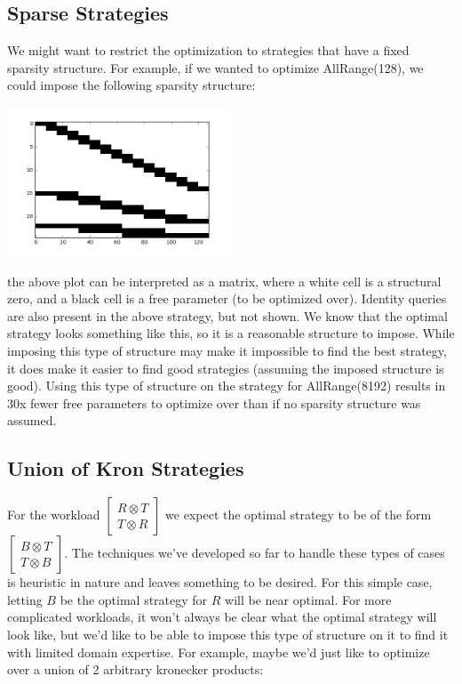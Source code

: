 \documentclass[12]{article}
\begin{document}
\subsection{Sparse Strategies}

We might want to restrict the optimization to strategies that have a fixed sparsity structure.  For example, if we wanted to optimize AllRange(128), we could impose the following sparsity structure:

\begin{center}
\includegraphics[width=0.5\textwidth]{sparse_structure} 
\end{center}

the above plot can be interpreted as a matrix, where a white cell is a structural zero, and a black cell is a  free parameter (to be optimized over).  Identity queries are also present in the above strategy, but not shown.  We know that the optimal strategy looks something like this, so it is a reasonable structure to impose.  While imposing this type of structure may make it impossible to find the best strategy, it does make it easier to find good strategies (assuming the imposed structure is good). 
Using this type of structure on the strategy for AllRange(8192) results in 30x fewer free parameters to optimize over than if no sparsity structure was assumed.

\subsection{Union of Kron Strategies}

For the workload $ \begin{bmatrix} R \otimes T \\ T \otimes R \end{bmatrix} $ we expect the optimal strategy to be of the form $ \begin{bmatrix} B \otimes T \\ T \otimes B \end{bmatrix} $.  The techniques we've developed so far to handle these types of cases is heuristic in nature and leaves something to be desired.  For this simple case, letting $B$ be the optimal strategy for $R$ will be near optimal.  For more complicated workloads, it won't always be clear what the optimal strategy will look like, but we'd like to be able to impose this type of structure on it to find it with limited domain expertise.  For example, maybe we'd just like to optimize over a union of 2 arbitrary kronecker products:
\end{document}
